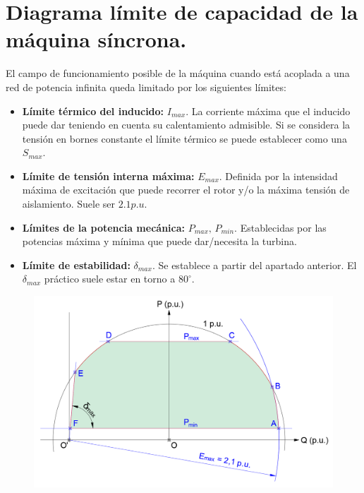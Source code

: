 	\section{Diagrama límite de capacidad de la máquina síncrona.}
		El campo de funcionamiento posible de la máquina cuando está acoplada a una red de potencia infinita queda limitado por los siguientes límites:
		\begin{itemize}
			\item \textbf{Límite térmico del inducido:} $I_{max}$. La corriente máxima que el inducido puede dar teniendo en cuenta su calentamiento admisible. Si se considera la tensión en bornes constante el límite térmico se puede establecer como una $S_{max}$.
			
			\item \textbf{Límite de tensión interna máxima:} $E_{max}$. Definida por la intensidad máxima de excitación que puede recorrer el rotor y/o la máxima tensión de aislamiento. Suele ser $2.1 p.u.$
			
			\item \textbf{Límites de la potencia mecánica:} $P_{max},\,P_{min}$. Establecidas por las potencias máxima y mínima que puede dar/necesita la turbina.
			
			\item \textbf{Límite de estabilidad:} $\delta_{max}$. Se establece a partir del apartado anterior. El $\delta_{max}$ práctico suele estar en torno a $80^\circ$.
		\end{itemize}
			
		\begin{figure}[H]
			\centering
			\includegraphics[width=0.8\linewidth]{res/tema6/diagramaCapacidad}
			\label{fig:diagramacapacidad}
		\end{figure}
		
